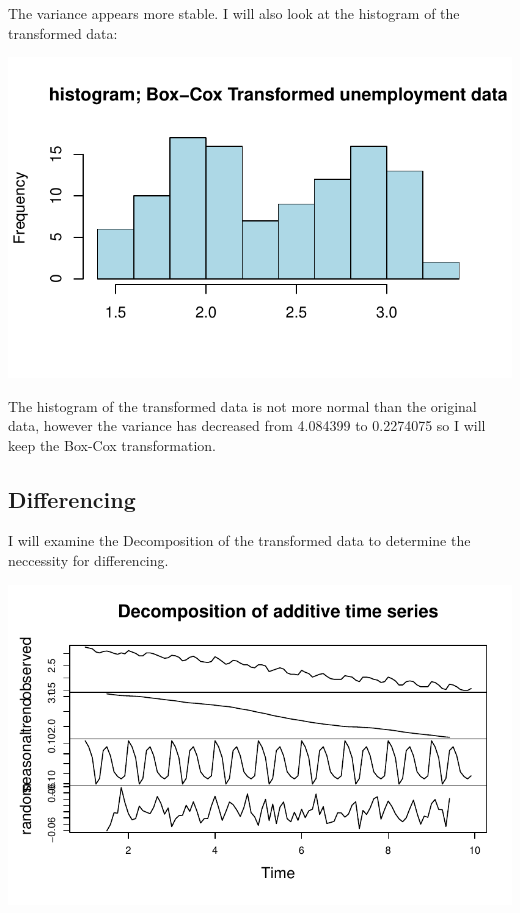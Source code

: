\documentclass[
  letterpaper,
  DIV=11,
  numbers=noendperiod]{scrartcl}
\begin{document}
The variance appears more stable. I will also look at the histogram of
the transformed data:

\includegraphics{Final_Project_files/figure-pdf/unnamed-chunk-8-1.pdf}

The histogram of the transformed data is not more normal than the
original data, however the variance has decreased from 4.084399 to
0.2274075 so I will keep the Box-Cox transformation.

\hypertarget{differencing}{%
\subsection{Differencing}\label{differencing}}

I will examine the Decomposition of the transformed data to determine
the neccessity for differencing.

\includegraphics{Final_Project_files/figure-pdf/unnamed-chunk-9-1.pdf}
\end{document}
